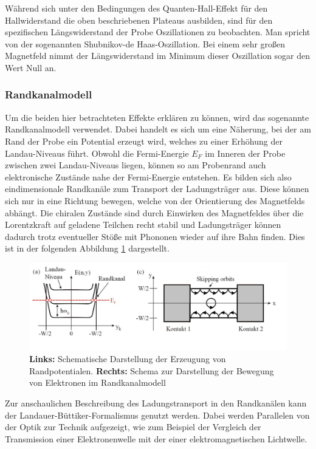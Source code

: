 Während sich unter den Bedingungen des Quanten-Hall-Effekt für den Hallwiderstand die oben beschriebenen Plateaus ausbilden, sind für den spezifischen Längswiderstand der Probe Oszillationen zu beobachten. Man spricht von der sogenannten Shubnikov-de Haas-Oszillation. Bei einem sehr großen Magnetfeld nimmt der Längswiderstand im Minimum dieser Oszillation sogar den Wert Null an.

\subsubsection{Randkanalmodell}

Um die beiden hier betrachteten Effekte erklären zu können, wird das sogenannte Randkanalmodell verwendet. Dabei handelt es sich um eine Näherung, bei der am Rand der Probe ein Potential erzeugt wird, welches zu einer Erhöhung der Landau-Niveaus führt. Obwohl die Fermi-Energie $E_F$ im Inneren der Probe zwischen zwei Landau-Niveaus liegen, können so am Probenrand auch elektronische Zustände nahe der Fermi-Energie entstehen. Es bilden sich also eindimensionale Randkanäle zum Transport der Ladungsträger aus. Diese können sich nur in eine Richtung bewegen, welche von der Orientierung des Magnetfelds abhängt. Die chiralen Zustände sind durch Einwirken des Magnetfeldes über die Lorentzkraft auf geladene Teilchen recht stabil und Ladungsträger können dadurch trotz  eventueller Stöße mit Phononen wieder auf ihre Bahn finden. Dies ist in der folgenden Abbildung \ref{fig:Randkanalmodell_Anleitungsheft} dargestellt.

\begin{figure}[h]
\centering
\includegraphics[width=0.7\linewidth]{images/Anleitungsheft/Randkanalmodell_Anleitungsheft}
\caption[Randkanalmodell]{\textbf{Links:} Schematische Darstellung der Erzeugung von Randpotentialen. \textbf{Rechts:} Schema zur Darstellung der Bewegung von Elektronen im Randkanalmodell}
\label{fig:Randkanalmodell_Anleitungsheft}
\end{figure}

Zur anschaulichen Beschreibung des Ladungstransport in den Randkanälen kann der Landauer-Büttiker-Formalismus genutzt werden. 
Dabei werden Parallelen von der Optik zur Technik aufgezeigt, wie zum Beispiel der Vergleich der Transmission einer Elektronenwelle mit der einer elektromagnetischen Lichtwelle. 

